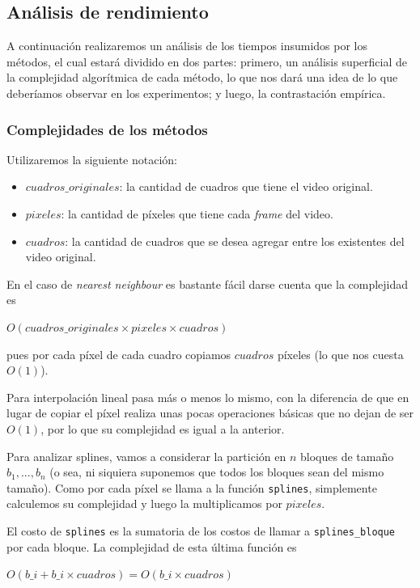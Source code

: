 \subsection{Análisis de rendimiento}
A continuación realizaremos un análisis de los tiempos insumidos por los métodos, el cual estará dividido en dos partes: primero, un análisis superficial de la complejidad algorítmica de cada método, lo que nos dará una idea de lo que deberíamos observar en los experimentos; y luego, la contrastación empírica.

\subsubsection{Complejidades de los métodos}
Utilizaremos la siguiente notación:
\begin{itemize}
	\item $cuadros\_originales$: la cantidad de cuadros que tiene el video original.
	\item $pixeles$: la cantidad de píxeles que tiene cada \emph{frame} del video.
	\item $cuadros$: la cantidad de cuadros que se desea agregar entre los existentes del video original.
\end{itemize}

En el caso de \emph{nearest neighbour} es bastante fácil darse cuenta que la complejidad es 

\begin{center}
	$O(cuadros\_originales \times pixeles \times cuadros)$
\end{center}

pues por cada píxel de cada cuadro copiamos $cuadros$ píxeles (lo que nos cuesta $O(1)$).

Para interpolación lineal pasa más o menos lo mismo, con la diferencia de que en lugar de copiar el píxel realiza unas pocas operaciones básicas que no dejan de ser $O(1)$, por lo que su complejidad es igual a la anterior.

Para analizar splines, vamos a considerar la partición en $n$ bloques de tamaño $b_1,..., b_n$ (o sea, ni siquiera suponemos que todos los bloques sean del mismo tamaño). Como por cada píxel se llama a la función \texttt{splines}, simplemente calculemos su complejidad y luego la multiplicamos por $pixeles$.

El costo de \texttt{splines} es la sumatoria de los costos de llamar a \texttt{splines\_bloque} por cada bloque. La complejidad de esta última función es 
\begin{center}
	$O(b\_i + b\_i \times cuadros) = O(b\_i \times cuadros)$
\end{center}

